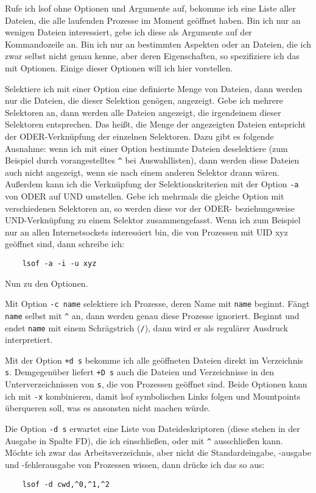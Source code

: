 \begin{normaltext}
  Rufe ich lsof ohne Optionen und Argumente auf, bekomme ich eine Liste aller
  Dateien, die alle laufenden Prozesse im Moment geöffnet haben. Bin ich nur
  an wenigen Dateien interessiert, gebe ich diese als Argumente auf der
  Kommandozeile an. Bin ich nur an bestimmten Aspekten oder an Dateien, die
  ich zwar selbst nicht genau kenne, aber deren Eigenschaften, so
  spezifiziere ich das mit Optionen. Einige dieser Optionen will ich hier
  vorstellen.
  
  Selektiere ich mit einer Option eine definierte Menge von
  Dateien, dann werden nur die Dateien, die dieser Selektion genögen,
  angezeigt. Gebe ich mehrere Selektoren an, dann werden alle Dateien
  angezeigt, die irgendeinem dieser Selektoren entsprechen. Das heißt, die
  Menge der angezeigten Dateien entspricht der ODER-Verknüpfung der einzelnen
  Selektoren. Dazu gibt es folgende Ausnahme: wenn ich mit einer Option
  bestimmte Dateien deselektiere (zum Beispiel durch vorangestelltes \verb?^?
  bei Auswahllisten), dann werden diese Dateien auch nicht angezeigt, wenn sie
  nach einem anderen Selektor drann wären. Außerdem kann ich die Verknüpfung
  der Selektionskriterien mit der Option \verb?-a? von ODER auf UND umstellen.
  Gebe ich mehrmals die gleiche Option mit verschiedenen Selektoren an, so
  werden diese vor der ODER- beziehungsweise UND-Verknüpfung zu einem Selektor
  zusammengefasst.
  Wenn ich zum Beispiel nur an allen Internetsockets interessiert bin, die von
  Prozessen mit UID xyz geöffnet sind, dann schreibe ich:
  \begin{verbatim}
    lsof -a -i -u xyz
  \end{verbatim}
  
  Nun zu den Optionen.

  Mit Option \verb?-c name? selektiere ich Prozesse, deren Name mit \verb?name?
  beginnt. Fängt \verb?name? selbst mit \verb?^? an, dann werden genau diese
  Prozesse ignoriert. Beginnt und endet \verb?name? mit einem Schrägstrich
  (\verb?/?), dann wird er als regulärer Ausdruck interpretiert.

  Mit der Option \verb?+d s? bekomme ich alle geöffneten Dateien direkt im
  Verzeichnis \verb?s?. Demgegenüber liefert \verb?+D s? auch die Dateien und
  Verzeichnisse in den Unterverzeichnissen von \verb?s?, die von Prozessen
  geöffnet sind. Beide Optionen kann ich mit \verb?-x? kombinieren, damit lsof
  symbolischen Links folgen und Mountpoints überqueren soll, was es ansonsten
  nicht machen würde.

  Die Option \verb?-d s? erwartet eine Liste von Dateideskriptoren (diese
  stehen in der Ausgabe in Spalte FD), die ich einschließen, oder mit \verb?^?
  ausschließen kann. Möchte ich zwar das Arbeitsverzeichnis, aber nicht die
  Standardeingabe, -ausgabe und -fehlerausgabe von Prozessen wissen, dann
  drücke ich das so aus:
  \begin{verbatim}
    lsof -d cwd,^0,^1,^2
  \end{verbatim}


\end{normaltext}
